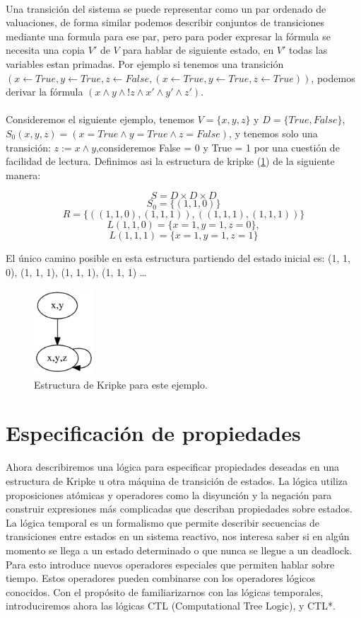 \\
Una transición del sistema se puede representar como un par ordenado de valuaciones, de forma similar podemos describir conjuntos de transiciones mediante una formula para ese par, pero para poder expresar la fórmula se necesita una copia $V'$ de $V$ para hablar de siguiente estado, en $V'$ todas las variables estan primadas. Por ejemplo si tenemos una transición $(x \gets True, y \gets True, z \gets False,(x \gets True, y \gets True, z \gets True))$, podemos derivar la fórmula $(x \land y \land !z \land x' \land y' \land z')$.\\
\\
Consideremos el siguiente ejemplo, tenemos $V = \{x,y,z\}$ y $D = \{True, False\}$, $S_{0} (x,y,z) = (x= True \land y = True \land z = False)$, y tenemos solo una transición: $z := x \land y$,consideremos False = 0 y True = 1 por una cuestión de facilidad de lectura. Definimos asi la estructura de kripke (\ref{fig:kripke1})  de la siguiente manera:

\[S = D \times D \times D\]
\[S_{0} = \{(1, 1, 0)\}\]
\[R = \{((1, 1, 0), (1, 1, 1)), ((1, 1, 1), (1, 1, 1))\}\]
\[L (1, 1, 0) = \{x = 1, y = 1, z = 0\},\]
\[L (1, 1, 1) = \{x = 1, y = 1, z = 1\}\]

El único camino posible en esta estructura partiendo del estado inicial es: (1, 1, 0), (1, 1, 1), (1, 1, 1), (1, 1, 1) …

\begin{figure}[h!]
  \centering
  \includegraphics[width=0.2\textwidth]{Figures/kripke.png}
  \caption{Estructura de Kripke para este ejemplo.}
  \label{fig:kripke1}
\end{figure}

\section{Especificación de propiedades}

Ahora describiremos una lógica para especificar propiedades deseadas en una estructura de Kripke u otra máquina de transición de estados. La lógica utiliza proposiciones atómicas y operadores como la disyunción y la negación para construir expresiones más complicadas que describan propiedades sobre estados.
La lógica temporal es un formalismo que permite describir secuencias de transiciones entre estados en un sistema reactivo, nos interesa saber si en algún momento se llega a un estado determinado o que nunca se llegue a un deadlock. Para esto introduce nuevos operadores especiales que permiten hablar sobre tiempo. Estos operadores pueden combinarse con los operadores lógicos conocidos.
Con el propósito de familiarizarnos con las lógicas temporales, introduciremos ahora las lógicas CTL (Computational Tree Logic), y CTL*. 

